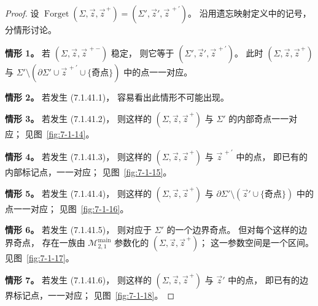 \begin{proof}
设
$\operatorname{Forget}(\Sigma,\vec z,\vec z^{\, +})
=(\Sigma',\vec z',\vec z^{\, +\prime})$。
沿用遗忘映射定义中的记号，
分情形讨论。

\noindent\textbf{情形 1。}
若
$(\Sigma,\vec z,\vec z^{\, + -})$
稳定，
则它等于
$(\Sigma',\vec z',\vec z^{\, +\prime})$。
此时
$(\Sigma,\vec z,\vec z^{\, +})$
与
$\Sigma'\setminus
(\partial\Sigma'\cup\vec z^{\, +\prime}
\cup\{\text{奇点}\})$
中的点一一对应。

\noindent\textbf{情形 2。}
若发生 (7.1.41.1)，
容易看出此情形不可能出现。

\noindent\textbf{情形 3。}
若发生 (7.1.41.2)，
则这样的
$(\Sigma,\vec z,\vec z^{\, +})$
与 $\Sigma'$ 的内部奇点一一对应；
见图~\ref{fig:7-1-14}。

\noindent\textbf{情形 4。}
若发生 (7.1.41.3)，
则这样的
$(\Sigma,\vec z,\vec z^{\, +})$
与 $\vec z^{\, +\prime}$ 中的点，
即已有的内部标记点，一一对应；
见图~\ref{fig:7-1-15}。

\noindent\textbf{情形 5。}
若发生 (7.1.41.4)，
则这样的
$(\Sigma,\vec z,\vec z^{\, +})$
与
$\partial\Sigma'\setminus
(\vec z'\cup\{\text{奇点}\})$
中的点一一对应；
见图~\ref{fig:7-1-16}。

\noindent\textbf{情形 6。}
若发生 (7.1.41.5)，
则对应于 $\Sigma'$ 的一个边界奇点。
但对每个这样的边界奇点，
存在一族由
$\mathcal M^{\mathrm{main}}_{2,1}$
参数化的
$(\Sigma,\vec z,\vec z^{\, +})$；
这一参数空间是一个区间。
见图~\ref{fig:7-1-17}。

\noindent\textbf{情形 7。}
若发生 (7.1.41.6)，
则这样的
$(\Sigma,\vec z,\vec z^{\, +})$
与 $\vec z'$ 中的点，
即已有的边界标记点，一一对应；
见图~\ref{fig:7-1-18}。


\end{proof}
